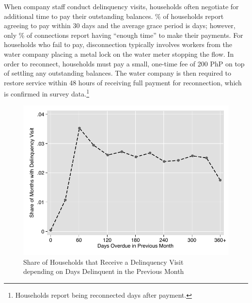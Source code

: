\documentclass[12pt]{article}
\begin{document}
When company staff conduct delinquency visits, households often negotiate for additional time to pay their outstanding balances.  \unskip\% of households report agreeing to pay within 30 days and the average grace period is days; however, only \unskip\% of connections report having ``enough time'' to make their payments.  For households who fail to pay, disconnection typically involves workers from the water company placing a metal lock on the water meter stopping the flow.  In order to reconnect, households must pay a small, one-time fee of 200 PhP on top of settling any outstanding balances.  The water company is then required to restore service within 48 hours of receiving full payment for reconnection, which is confirmed in survey data.\footnote{Households report being reconnected days after payment.}  


\begin{figure}
\centering
\caption{Share of Households that Receive a Delinquency Visit \\ depending on Days Delinquent in the Previous Month}\label{figure:dc_hazard}
\includegraphics[scale=.7]{tables/connected_visit_hazard_all.pdf}
\end{figure}
\end{document}
